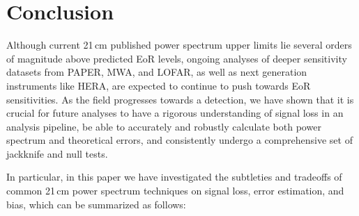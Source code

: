 \documentclass[preprint2,numberedappendix,tighten]{aastex6}  %
\begin{document}


\section{Conclusion}
\label{sec:Con}

Although current 21\,cm published power spectrum upper limits lie several orders of magnitude above predicted EoR levels, 
ongoing analyses of deeper sensitivity datasets from PAPER, MWA, and LOFAR, as well as next generation instruments like 
HERA, are expected to continue to push towards EoR sensitivities. As the field progresses towards a detection, we have shown 
that it is crucial for future analyses to have a rigorous understanding of signal loss in an analysis pipeline, be able to accurately 
and robustly calculate both power spectrum and theoretical errors, and consistently undergo a comprehensive set of jackknife 
and null tests.

In particular, in this paper we have investigated the subtleties and tradeoffs of common 21\,cm power spectrum techniques on 
signal loss, error estimation, and bias, which can be summarized as follows:
\end{document}
